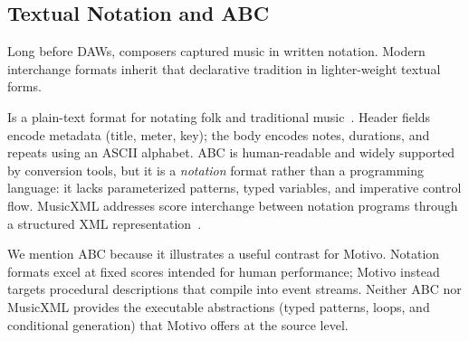 \subsection{Textual Notation and ABC}\label{subsec:abc-notation}

Long before DAWs, composers captured music in written notation.
Modern interchange formats inherit that declarative tradition in lighter-weight textual forms.

 Is a plain-text format for notating folk and traditional music~\cite{Walshaw_2011}.
Header fields encode metadata (title, meter, key); the body encodes notes, durations, and repeats using an ASCII
alphabet.
ABC is human-readable and widely supported by conversion tools, but it is a \textit{notation} format rather than a
programming language: it lacks parameterized patterns, typed variables, and imperative control flow.
MusicXML addresses score interchange between notation programs through a structured XML representation~\cite{Good_2001}.

We mention ABC because it illustrates a useful contrast for Motivo.
Notation formats excel at fixed scores intended for human performance; Motivo instead targets procedural descriptions
that compile into event streams.
Neither ABC nor MusicXML provides the executable abstractions (typed patterns, loops, and conditional generation) that
Motivo offers at the source level.
